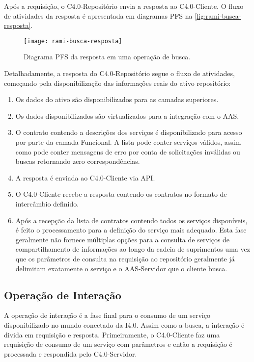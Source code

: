 Após a requisição, o C4.0-Repositório envia a resposta ao C4.0-Cliente. O fluxo de atividades da resposta é apresentada em diagramas PFS na \autoref{fig:rami-busca-resposta}.

\begin{figure}[htb]
	\centering
	\texttt{[image: rami-busca-resposta]}
	\caption{Diagrama PFS da resposta em uma operação de busca.}
	\label{fig:rami-busca-resposta}
\end{figure}

Detalhadamente, a resposta do C4.0-Repositório segue o fluxo de atividades, começando pela disponibilização das informações reais do ativo repositório:

\begin{enumerate}
	\item Os dados do ativo são disponibilizados para as camadas superiores.

	\item Os dados disponibilizados são virtualizados para a integração com o AAS.

	\item O contrato contendo a descrições dos serviços é disponibilizado para acesso por parte da camada Funcional. A lista  pode conter serviços válidos, assim como pode conter mensagens de erro por conta de solicitações inválidas ou buscas retornando zero correspondências.

	\item A resposta é enviada ao C4.0-Cliente via API.

	\item O C4.0-Cliente recebe a resposta contendo os contratos no formato de intercâmbio definido.

	\item Após a recepção da lista de contratos contendo todos os serviços disponíveis, é feito o processamento para a definição do serviço mais adequado. Esta fase geralmente não fornece múltiplas opções para a consulta de serviços de compartilhamento de informações ao longo da cadeia de suprimentos uma vez que os parâmetros de consulta na requisição ao repositório geralmente já delimitam exatamente o serviço e o AAS-Servidor que o cliente busca.
\end{enumerate}

\subsection{Operação de Interação}

A operação de interação é a fase final para o consumo de um serviço disponibilizado no mundo conectado da I4.0. Assim como a busca, a interação é divida em requisição e resposta. Primeiramente, o C4.0-Cliente faz uma requisição de consumo de um serviço com parâmetros e então a requisição é processada e respondida pelo C4.0-Servidor.

